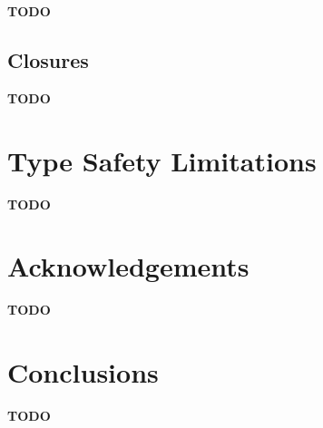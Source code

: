 \documentclass{sig-alternate}
\begin{document}
\textbf{TODO}

\subsection{Closures}

\textbf{TODO}

\section{Type Safety Limitations}

\textbf{TODO}

\section{Acknowledgements}

\textbf{TODO}

\section{Conclusions}

\textbf{TODO}



\end{document}
